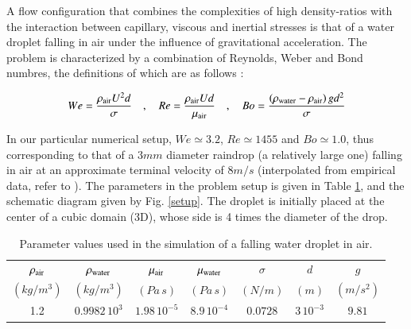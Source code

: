 
A flow configuration that combines the complexities of high density-ratios with the interaction between capillary, viscous and inertial stresses is that of a water droplet falling in air under the influence of gravitational acceleration. The problem is characterized by a combination of Reynolds, Weber and Bond numbres, the definitions of which are as follows : 

\begin{align}
We=\frac{\rho_{\rm air} U^2 d}{\sigma} \quad,\quad Re= \frac{\rho_{\rm air} U d}{\mu_{\rm air}} \quad,\quad Bo=\frac{\left(\rho_{\rm water}-\rho_{\rm air}\right) g d^2 }{\sigma}
\end{align}

\vspace*{0.2cm}

In our particular numerical setup, $We \simeq 3.2 $, $Re \simeq 1455 $ and $Bo \simeq 1.0 $, thus corresponding to that of a $3mm$ diameter raindrop (a relatively large one) falling in air at an approximate terminal velocity of  $8 m/s$ (interpolated from empirical data, refer to  \cite{gunn1949terminal}). The parameters in the problem setup is given in Table \ref{raindropprop}, and the schematic diagram given by Fig. \ref{setup}. The droplet is initially placed at the center of a cubic domain (3D), whose side is 4 times the diameter of the drop. 

\vspace*{0.2cm}

\begin{table}[h!]
\begin{center}
\begin{tabular}{ccccccc}
\hline\hline
$\rho_{\rm air}$ & $\rho_{\rm water}$ & $\mu_{\rm air}$ 
& $\mu_{\rm water}$ & $\sigma$ & $d$ & $g$\\
$\left(kg/m^3\right)$ & $\left(kg/m^3\right)$ & $\left(Pa \, s\right)$ 
& $\left(Pa \,s \right)$ & $\left(N/m\right)$ & $(m)$ & $(m /s^{2})$ \\
\hline
1.2 & $0.9982\, 10^3$ & $1.98\,10^{-5}$ & 
$8.9 \, 10^{-4}$ & $0.0728$ & $3\, 10^{-3}$ & $9.81$\\
\hline\hline
\end{tabular}
\caption{Parameter values used in the simulation of a falling water droplet in air. \label{raindropprop}}
\end{center}
\end{table}

\vspace*{0.2cm}


